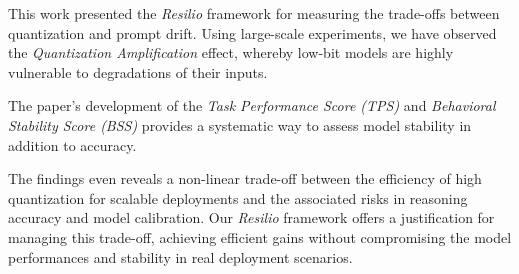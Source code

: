 \documentclass[conference]{IEEEtran}
\begin{document}
This work presented the \textit{Resilio} framework for measuring the trade-offs between quantization and prompt drift. Using large-scale experiments, we have observed the \textit{Quantization Amplification} effect, whereby low-bit models are highly vulnerable to degradations of their inputs.

The paper's development of the \textit{Task Performance Score (TPS)} and \textit{Behavioral Stability Score (BSS)} provides a systematic way to assess model stability in addition to accuracy.

The findings even reveals a non-linear trade-off between the efficiency of high quantization for scalable deployments and the associated risks in reasoning accuracy and model calibration. Our \textit{Resilio} framework offers a justification for managing this trade-off, achieving efficient gains without compromising the model performances and stability in real deployment scenarios.

\end{document}
